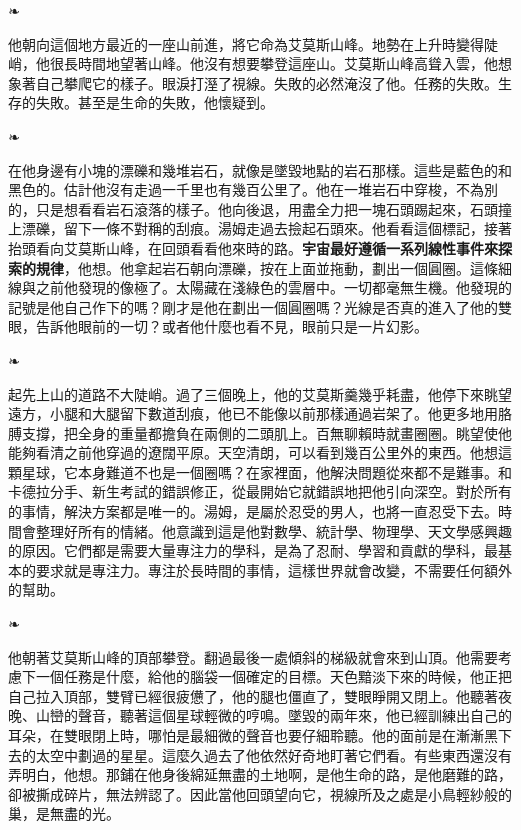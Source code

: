 \documentclass[10pt]{article}
\begin{document}
\begin{center}❧\end{center}

他朝向這個地方最近的一座山前進，將它命為艾莫斯山峰。地勢在上升時變得陡峭，他很長時間地望著山峰。他沒有想要攀登這座山。艾莫斯山峰高聳入雲，他想象著自己攀爬它的樣子。眼淚打溼了視線。失敗的必然淹沒了他。任務的失敗。生存的失敗。甚至是生命的失敗，他懷疑到。

\begin{center}❧\end{center}

在他身邊有小塊的漂礫和幾堆岩石，就像是墜毀地點的岩石那樣。這些是藍色的和黑色的。估計他沒有走過一千里也有幾百公里了。他在一堆岩石中穿梭，不為別的，只是想看看岩石滾落的樣子。他向後退，用盡全力把一塊石頭踢起來，石頭撞上漂礫，留下一條不對稱的刮痕。湯姆走過去撿起石頭來。他看看這個標記，接著抬頭看向艾莫斯山峰，在回頭看看他來時的路。\textbf{宇宙最好遵循一系列線性事件來探索的規律}，他想。他拿起岩石朝向漂礫，按在上面並拖動，劃出一個圓圈。這條細線與之前他發現的像極了。太陽藏在淺綠色的雲層中。一切都毫無生機。他發現的記號是他自己作下的嗎？剛才是他在劃出一個圓圈嗎？光線是否真的進入了他的雙眼，告訴他眼前的一切？或者他什麼也看不見，眼前只是一片幻影。

\begin{center}❧\end{center}

起先上山的道路不大陡峭。過了三個晚上，他的艾莫斯羹幾乎耗盡，他停下來眺望遠方，小腿和大腿留下數道刮痕，他已不能像以前那樣通過岩架了。他更多地用胳膊支撐，把全身的重量都擔負在兩側的二頭肌上。百無聊賴時就畫圈圈。眺望使他能夠看清之前他穿過的遼闊平原。天空清朗，可以看到幾百公里外的東西。他想這顆星球，它本身難道不也是一個圈嗎？在家裡面，他解決問題從來都不是難事。和卡德拉分手、新生考試的錯誤修正，從最開始它就錯誤地把他引向深空。對於所有的事情，解決方案都是唯一的。湯姆，是屬於忍受的男人，也將一直忍受下去。時間會整理好所有的情緒。他意識到這是他對數學、統計學、物理學、天文學感興趣的原因。它們都是需要大量專注力的學科，是為了忍耐、學習和貢獻的學科，最基本的要求就是專注力。專注於長時間的事情，這樣世界就會改變，不需要任何額外的幫助。

\begin{center}❧\end{center}

他朝著艾莫斯山峰的頂部攀登。翻過最後一處傾斜的梯級就會來到山頂。他需要考慮下一個任務是什麼，給他的腦袋一個確定的目標。天色黯淡下來的時候，他正把自己拉入頂部，雙臂已經很疲憊了，他的腿也僵直了，雙眼睜開又閉上。他聽著夜晚、山巒的聲音，聽著這個星球輕微的哼鳴。墜毀的兩年來，他已經訓練出自己的耳朵，在雙眼閉上時，哪怕是最細微的聲音也要仔細聆聽。他的面前是在漸漸黑下去的太空中劃過的星星。這麼久過去了他依然好奇地盯著它們看。有些東西還沒有弄明白，他想。那鋪在他身後綿延無盡的土地啊，是他生命的路，是他磨難的路，卻被撕成碎片，無法辨認了。因此當他回頭望向它，視線所及之處是小鳥輕紗般的巢，是無盡的光。
\end{document}
